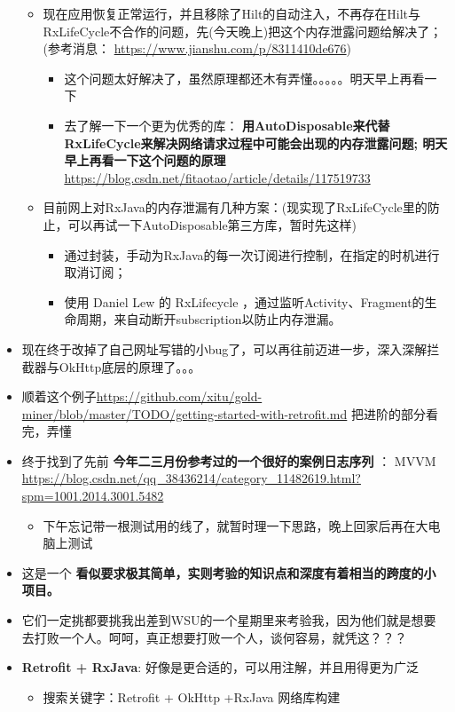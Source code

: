 \documentclass[9pt, b5paper]{article}
\begin{document}
\begin{itemize}
\begin{itemize}
\item 现在应用恢复正常运行，并且移除了Hilt的自动注入，不再存在Hilt与RxLifeCycle不合作的问题，先(今天晚上)把这个内存泄露问题给解决了；(参考消息： \url{https://www.jianshu.com/p/8311410de676})
\begin{itemize}
\item 这个问题太好解决了，虽然原理都还木有弄懂。。。。。明天早上再看一下
\item 去了解一下一个更为优秀的库： \textbf{用AutoDisposable来代替RxLifeCycle来解决网络请求过程中可能会出现的内存泄露问题; 明天早上再看一下这个问题的原理} \url{https://blog.csdn.net/fitaotao/article/details/117519733}
\end{itemize}
\item 目前网上对RxJava的内存泄漏有几种方案：(现实现了RxLifeCycle里的防止，可以再试一下AutoDisposable第三方库，暂时先这样)
\begin{itemize}
\item 通过封装，手动为RxJava的每一次订阅进行控制，在指定的时机进行取消订阅；
\item 使用 Daniel Lew 的 RxLifecycle ，通过监听Activity、Fragment的生命周期，来自动断开subscription以防止内存泄漏。
\end{itemize}
\end{itemize}
\item 现在终于改掉了自己网址写错的小bug了，可以再往前迈进一步，深入深解拦截器与OkHttp底层的原理了。。。
\item 顺着这个例子\url{https://github.com/xitu/gold-miner/blob/master/TODO/getting-started-with-retrofit.md} 把进阶的部分看完，弄懂
\item 终于找到了先前 \textbf{今年二三月份参考过的一个很好的案例日志序列} ： MVVM \url{https://blog.csdn.net/qq_38436214/category_11482619.html?spm=1001.2014.3001.5482}
\begin{itemize}
\item 下午忘记带一根测试用的线了，就暂时理一下思路，晚上回家后再在大电脑上测试
\end{itemize}
\item 这是一个 \textbf{看似要求极其简单，实则考验的知识点和深度有着相当的跨度的小项目。}
\item 它们一定挑都要挑我出差到WSU的一个星期里来考验我，因为他们就是想要去打败一个人。呵呵，真正想要打败一个人，谈何容易，就凭这？？？
\item \textbf{Retrofit + RxJava}: 好像是更合适的，可以用注解，并且用得更为广泛
\begin{itemize}
\item 搜索关键字：Retrofit + OkHttp +RxJava 网络库构建

\end{itemize}
\end{itemize}
\end{document}
